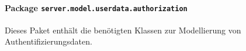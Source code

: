 \FloatBarrier
\paragraph[Package server.model.userdata.authorization]{Package \texttt{server.model.userdata.authorization}}
Dieses Paket enthält die benötigten Klassen zur Modellierung von Authentifizierungsdaten.

       